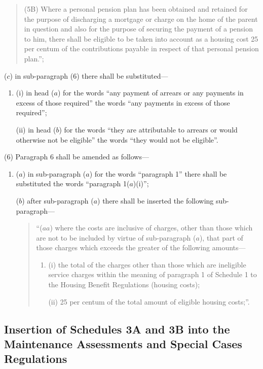 \documentclass[a4paper]{article}
\begin{document}
\begin{enumerate}
\begin{quotation}
(5B) Where a personal pension plan has been obtained and retained for the purpose of discharging a mortgage or charge on the home of the parent in question and also for the purpose of securing the payment of a pension to him, there shall be eligible to be taken into account as a housing cost 25 per centum of the contributions payable in respect of that personal pension plan.”;
\end{quotation}

($c$) in sub-paragraph (6) there shall be substituted—
\begin{enumerate}\item[]
(i) in head ($a$) for the words “any payment of arrears or any payments in excess of those required” the words “any payments in excess of those required”;

(ii) in head ($b$) for the words “they are attributable to arrears or would otherwise not be eligible” the words “they would not be eligible”.
\end{enumerate}
\end{enumerate}

(6) Paragraph 6 shall be amended as follows—
\begin{enumerate}\item[]
($a$) in sub-paragraph ($a$) for the words “paragraph 1” there shall be substituted the words “paragraph 1($a$)(i)”;

($b$) after sub-paragraph ($a$) there shall be inserted the following sub-paragraph—
\begin{quotation}
“($aa$) where the costs are inclusive of charges, other than those which are not to be included by virtue of sub-paragraph ($a$), that part of those charges which exceeds the greater of the following amounts—
\begin{enumerate}\item[]
(i) the total of the charges other than those which are ineligible service charges within the meaning of paragraph 1 of Schedule 1 to the Housing Benefit Regulations (housing costs);

(ii) 25 per centum of the total amount of eligible housing costs;”.
\end{enumerate}
\end{quotation}
\end{enumerate}

\subsection[57. Insertion of Schedules 3A and 3B into the Maintenance Assessments and Special Cases Regulations]{Insertion of Schedules 3A and 3B into the Maintenance Assessments and Special Cases Regulations}
\end{document}
